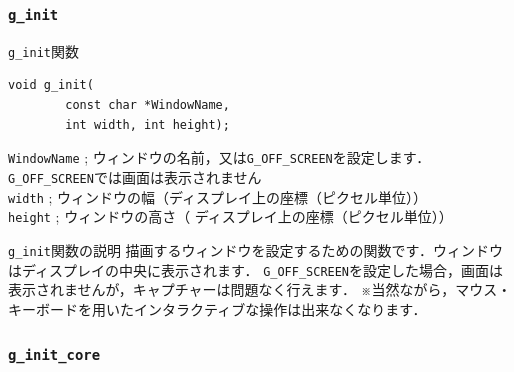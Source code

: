 \documentclass[platex,a4paper,12pt]{jsarticle}%
\begin{document}
\subsubsection{\texttt{g\_init}}

\begin{itembox}[l]{\texttt{g\_init}関数}
\begin{verbatim}
void g_init(
        const char *WindowName,
        int width, int height);
\end{verbatim}
\verb|WindowName| ; ウィンドウの名前，又は\verb|G_OFF_SCREEN|を設定します．\verb|G_OFF_SCREEN|では画面は表示されません\\
\verb|width| ; ウィンドウの幅（ディスプレイ上の座標（ピクセル単位））\\
\verb|height| ; ウィンドウの高さ（ ディスプレイ上の座標（ピクセル単位））
\end{itembox}

\begin{itembox}[l]{\texttt{g\_init}関数の説明}
描画するウィンドウを設定するための関数です．ウィンドウはディスプレイの中央に表示されます．
\verb|G_OFF_SCREEN|を設定した場合，画面は表示されませんが，キャプチャーは問題なく行えます．
※当然ながら，マウス・キーボードを用いたインタラクティブな操作は出来なくなります．
\end{itembox}


\clearpage
\subsubsection{\texttt{g\_init\_core}}
\end{document}
